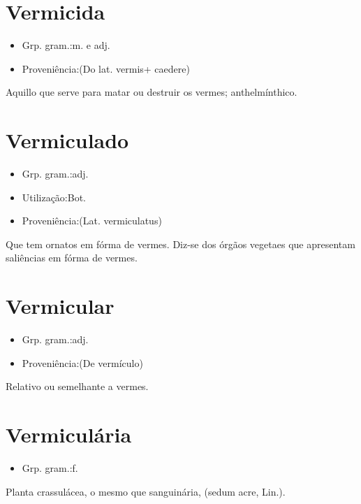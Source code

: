 \documentclass{article}
\begin{document}
\section{Vermicida}
\begin{itemize}
\item {Grp. gram.:m.  e  adj.}
\end{itemize}
\begin{itemize}
\item {Proveniência:(Do lat. \textunderscore vermis\textunderscore  + \textunderscore caedere\textunderscore )}
\end{itemize}
Aquillo que serve para matar ou destruir os vermes; anthelmínthico.
\section{Vermiculado}
\begin{itemize}
\item {Grp. gram.:adj.}
\end{itemize}
\begin{itemize}
\item {Utilização:Bot.}
\end{itemize}
\begin{itemize}
\item {Proveniência:(Lat. \textunderscore vermiculatus\textunderscore )}
\end{itemize}
Que tem ornatos em fórma de vermes.
Diz-se dos órgãos vegetaes que apresentam saliências em fórma de vermes.
\section{Vermicular}
\begin{itemize}
\item {Grp. gram.:adj.}
\end{itemize}
\begin{itemize}
\item {Proveniência:(De \textunderscore vermículo\textunderscore )}
\end{itemize}
Relativo ou semelhante a vermes.
\section{Vermiculária}
\begin{itemize}
\item {Grp. gram.:f.}
\end{itemize}
Planta crassulácea, o mesmo que \textunderscore sanguinária\textunderscore , (\textunderscore sedum acre\textunderscore , Lin.).
\end{document}

